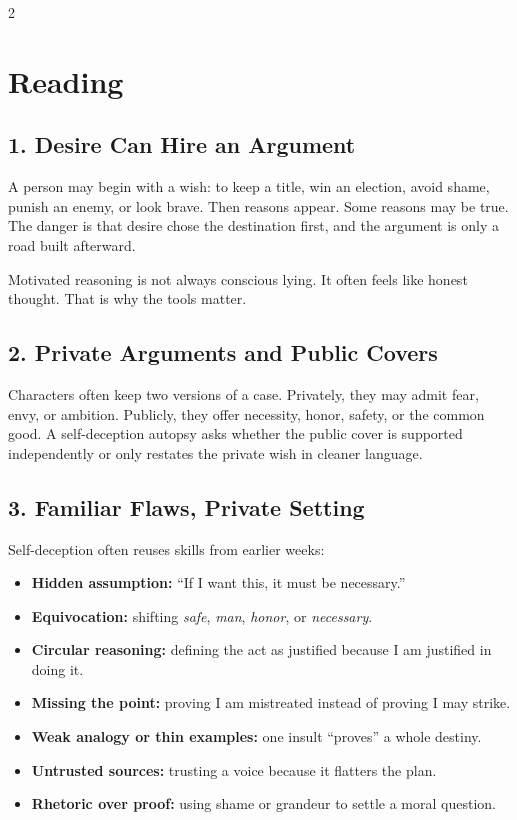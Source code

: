 \documentclass[12pt]{article}
\begin{document}
\begin{multicols}{2}
\section*{Reading}

\subsection*{1. Desire Can Hire an Argument}
A person may begin with a wish: to keep a title, win an election, avoid shame, punish an enemy, or look brave. Then reasons appear. Some reasons may be true. The danger is that desire chose the destination first, and the argument is only a road built afterward.

Motivated reasoning is not always conscious lying. It often feels like honest thought. That is why the tools matter.

\subsection*{2. Private Arguments and Public Covers}
Characters often keep two versions of a case. Privately, they may admit fear, envy, or ambition. Publicly, they offer necessity, honor, safety, or the common good. A self-deception autopsy asks whether the public cover is supported independently or only restates the private wish in cleaner language.

\subsection*{3. Familiar Flaws, Private Setting}
Self-deception often reuses skills from earlier weeks:

\begin{itemize}[leftmargin=*]
\item \textbf{Hidden assumption:} ``If I want this, it must be necessary.''
\item \textbf{Equivocation:} shifting \textit{safe}, \textit{man}, \textit{honor}, or \textit{necessary}.
\item \textbf{Circular reasoning:} defining the act as justified because I am justified in doing it.
\item \textbf{Missing the point:} proving I am mistreated instead of proving I may strike.
\item \textbf{Weak analogy or thin examples:} one insult ``proves'' a whole destiny.
\item \textbf{Untrusted sources:} trusting a voice because it flatters the plan.
\item \textbf{Rhetoric over proof:} using shame or grandeur to settle a moral question.
\end{itemize}


\end{multicols}
\end{document}
